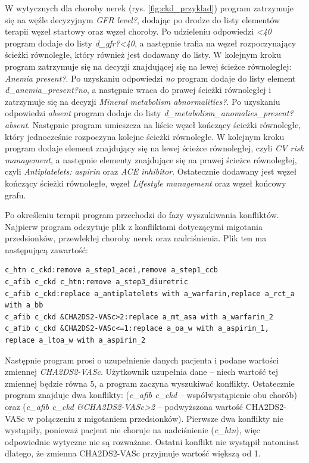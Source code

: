 W wytycznych dla choroby nerek (rys. \ref{fig:ckd_przyklad}) program zatrzymuje się na węźle decyzyjnym \textit{GFR level?}, dodając po drodze do listy elementów terapii węzeł startowy oraz węzeł choroby. Po udzieleniu odpowiedzi \textit{<40} program dodaje do listy \textit{d\_gfr?<40}, a następnie trafia na węzeł rozpoczynający ścieżki równoległe, który również jest dodawany do listy. W kolejnym kroku program zatrzymuje się na  decyzji znajdującej się na lewej ścieżce równoległej: \textit{Anemia present?}. Po uzyskaniu odpowiedzi \textit{no} program dodaje do listy element \textit{d\_anemia\_present?no}, a następnie wraca do prawej ścieżki równoległej i zatrzymuje się na decyzji \textit{Mineral metabolism abnormalities?}. Po uzyskaniu odpowiedzi \textit{absent} program dodaje do listy \textit{d\_metabolism\_anomalies\_present?absent}. Następnie program umieszcza na liście węzeł kończący ścieżki równoległe, który jednocześnie rozpoczyna kolejne ścieżki równoległe. W kolejnym kroku program dodaje element znajdujący się na lewej ścieżce równoległej, czyli \textit{CV risk management}, a następnie elementy znajdujące się na prawej ścieżce równoległej, czyli \textit{Antiplatelets: aspirin} oraz \textit{ACE inhibitor}. Ostatecznie dodawany jest węzeł kończący ścieżki równoległe, węzeł \textit{Lifestyle management} oraz węzeł końcowy grafu.

Po określeniu terapii program przechodzi do fazy wyszukiwania konfliktów. 
Najpierw program odczytuje plik z konfliktami dotyczącymi migotania przedsionków, przewlekłej choroby nerek oraz nadciśnienia. Plik ten ma następującą zawartość:
\begin{verbatim}
c_htn c_ckd:remove a_step1_acei,remove a_step1_ccb
c_afib c_ckd c_htn:remove a_step3_diuretric
c_afib c_ckd:replace a_antiplatelets with a_warfarin,replace a_rct_a with a_bb
c_afib c_ckd &CHA2DS2-VASc>2:replace a_mt_asa with a_warfarin_2
c_afib c_ckd &CHA2DS2-VASc<=1:replace a_oa_w with a_aspirin_1,
replace a_ltoa_w with a_aspirin_2
\end{verbatim}
Następnie program prosi o uzupełnienie danych pacjenta i podane wartości zmiennej \textit{CHA2\-DS2-VASc}. Użytkownik uzupełnia dane -- niech wartość tej zmiennej będzie równa 5, a program zaczyna wyszukiwać konflikty. Ostatecznie program znajduje dwa konflikty: (\textit{c\_afib c\_ckd} -- współwystąpienie obu chorób) oraz (\textit{c\_afib c\_ckd \&CHA2DS2-VASc>2} -- podwyższona wartość CHA2DS2-VASc w połączeniu z migotaniem przedsionków). Pierwsze dwa konflikty nie wystąpiły, ponieważ pacjent nie choruje na nadciśnienie (\textit{c\_htn}), więc odpowiednie wytyczne nie są rozważane. Ostatni konflikt nie wystąpił natomiast dlatego, że zmienna CHA2DS2-VASc przyjmuje wartość większą od 1.

